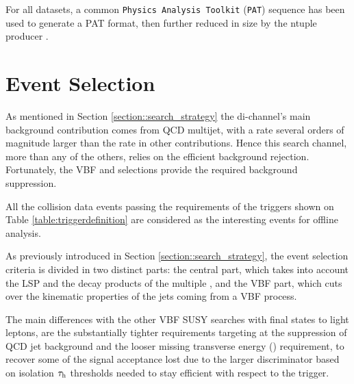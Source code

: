 For all datasets, a common \texttt{Physics Analysis Toolkit} (\texttt{PAT}) \cite{Adam:2010zza} sequence has been used to generate a PAT format, then further reduced in size by the ntuple producer \cite{bib:thentuplemaker}.



\section{Event Selection}
\label{sec:eventselection}



As mentioned in Section \ref{section::search_strategy} the di-\hadtau channel's main background contribution comes from QCD multijet, with a rate several orders of magnitude larger than the rate in other contributions. Hence this search channel, more than any of the others, relies on the efficient background rejection. Fortunately, the VBF and \met selections provide the required background suppression.

All the collision data events passing the requirements of the triggers shown on Table \ref{table:triggerdefinition} are considered as the interesting events for offline analysis. 

As previously introduced in Section \ref{section::search_strategy}, the event selection criteria is divided in two distinct parts: the central part, which takes into account the LSP and the decay products of the multiple \hadtau, and the VBF part, which cuts over the kinematic properties of the jets coming from a VBF process. 

The main differences with the other VBF SUSY searches with final states to light leptons, are the substantially tighter \hadtau requirements targeting at the suppression of QCD jet background and the looser missing transverse energy (\met) requirement, to recover some of the signal acceptance lost due to the larger discriminator based on isolation $\tau_{\text{h}}$ \pt thresholds needed to stay efficient with respect to the trigger. 

